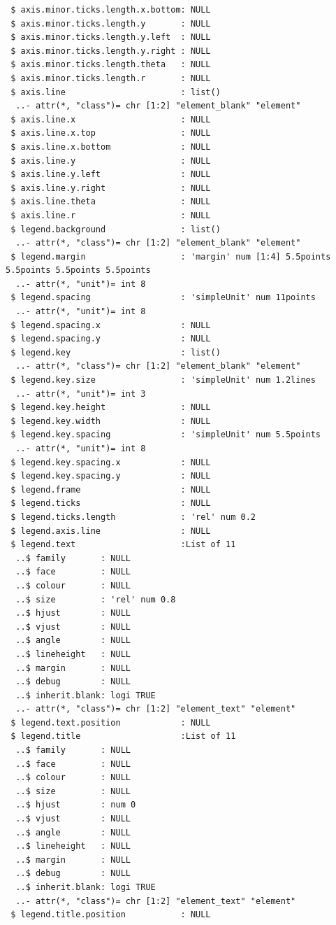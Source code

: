 \documentclass[
  letterpaper,
  DIV=11,
  numbers=noendperiod]{scrartcl}
\begin{document}
\begin{verbatim}
 $ axis.minor.ticks.length.x.bottom: NULL
 $ axis.minor.ticks.length.y       : NULL
 $ axis.minor.ticks.length.y.left  : NULL
 $ axis.minor.ticks.length.y.right : NULL
 $ axis.minor.ticks.length.theta   : NULL
 $ axis.minor.ticks.length.r       : NULL
 $ axis.line                       : list()
  ..- attr(*, "class")= chr [1:2] "element_blank" "element"
 $ axis.line.x                     : NULL
 $ axis.line.x.top                 : NULL
 $ axis.line.x.bottom              : NULL
 $ axis.line.y                     : NULL
 $ axis.line.y.left                : NULL
 $ axis.line.y.right               : NULL
 $ axis.line.theta                 : NULL
 $ axis.line.r                     : NULL
 $ legend.background               : list()
  ..- attr(*, "class")= chr [1:2] "element_blank" "element"
 $ legend.margin                   : 'margin' num [1:4] 5.5points 5.5points 5.5points 5.5points
  ..- attr(*, "unit")= int 8
 $ legend.spacing                  : 'simpleUnit' num 11points
  ..- attr(*, "unit")= int 8
 $ legend.spacing.x                : NULL
 $ legend.spacing.y                : NULL
 $ legend.key                      : list()
  ..- attr(*, "class")= chr [1:2] "element_blank" "element"
 $ legend.key.size                 : 'simpleUnit' num 1.2lines
  ..- attr(*, "unit")= int 3
 $ legend.key.height               : NULL
 $ legend.key.width                : NULL
 $ legend.key.spacing              : 'simpleUnit' num 5.5points
  ..- attr(*, "unit")= int 8
 $ legend.key.spacing.x            : NULL
 $ legend.key.spacing.y            : NULL
 $ legend.frame                    : NULL
 $ legend.ticks                    : NULL
 $ legend.ticks.length             : 'rel' num 0.2
 $ legend.axis.line                : NULL
 $ legend.text                     :List of 11
  ..$ family       : NULL
  ..$ face         : NULL
  ..$ colour       : NULL
  ..$ size         : 'rel' num 0.8
  ..$ hjust        : NULL
  ..$ vjust        : NULL
  ..$ angle        : NULL
  ..$ lineheight   : NULL
  ..$ margin       : NULL
  ..$ debug        : NULL
  ..$ inherit.blank: logi TRUE
  ..- attr(*, "class")= chr [1:2] "element_text" "element"
 $ legend.text.position            : NULL
 $ legend.title                    :List of 11
  ..$ family       : NULL
  ..$ face         : NULL
  ..$ colour       : NULL
  ..$ size         : NULL
  ..$ hjust        : num 0
  ..$ vjust        : NULL
  ..$ angle        : NULL
  ..$ lineheight   : NULL
  ..$ margin       : NULL
  ..$ debug        : NULL
  ..$ inherit.blank: logi TRUE
  ..- attr(*, "class")= chr [1:2] "element_text" "element"
 $ legend.title.position           : NULL

\end{verbatim}
\end{document}

